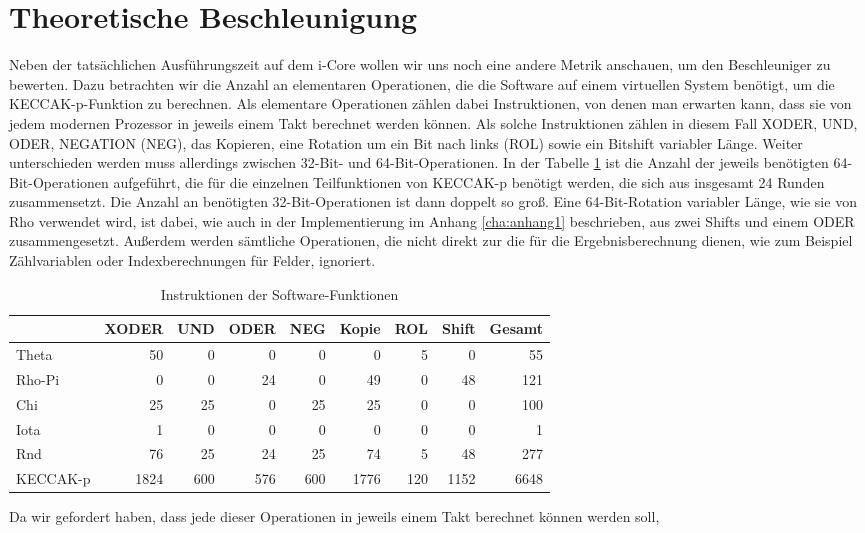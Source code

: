 \section{Theoretische Beschleunigung}
Neben der tatsächlichen Ausführungszeit auf dem i-Core wollen wir uns noch eine andere Metrik anschauen, um den Beschleuniger zu bewerten.
Dazu betrachten wir die Anzahl an elementaren Operationen, die die Software auf einem virtuellen System benötigt, um die KECCAK-p-Funktion zu berechnen.
Als elementare Operationen zählen dabei Instruktionen, von denen man erwarten kann, dass sie von jedem modernen Prozessor in jeweils einem Takt berechnet werden können.
Als solche Instruktionen zählen in diesem Fall XODER, UND, ODER, NEGATION (NEG), das Kopieren, eine Rotation um ein Bit nach links (ROL) sowie ein Bitshift variabler Länge.
Weiter unterschieden werden muss allerdings zwischen 32-Bit- und 64-Bit-Operationen. In der Tabelle \ref{tab:software_instruktionen} ist
die Anzahl der jeweils benötigten 64-Bit-Operationen aufgeführt, die für die einzelnen Teilfunktionen von KECCAK-p benötigt werden, die sich aus insgesamt 24 Runden zusammensetzt.
Die Anzahl an benötigten 32-Bit-Operationen ist dann doppelt so groß. Eine 64-Bit-Rotation variabler Länge, wie sie von Rho verwendet wird,
ist dabei, wie auch in der Implementierung im Anhang \ref{cha:anhang1} beschrieben, aus zwei Shifts und einem ODER zusammengesetzt.
Außerdem werden sämtliche Operationen, die nicht direkt zur die für die Ergebnisberechnung dienen,
wie zum Beispiel Zählvariablen oder Indexberechnungen für Felder, ignoriert.
\begin{table}
    \centering
    \begin{tabular}{lrrrrrrrr}
        & XODER & UND & ODER & NEG & Kopie & ROL & Shift & Gesamt \\
        \hline
        Theta & 50 & 0 & 0 & 0 & 0 & 5 & 0 & 55 \\
        Rho-Pi & 0 & 0 & 24 & 0 & 49 & 0 & 48 & 121 \\
        Chi & 25 & 25 & 0 & 25 & 25 & 0 & 0 & 100 \\
        Iota & 1 & 0 & 0 & 0 & 0 & 0 & 0 & 1 \\
        Rnd & 76 & 25 & 24 & 25 & 74 & 5 & 48 & 277\\
        KECCAK-p & 1824 & 600 & 576 & 600 & 1776 & 120 & 1152 & 6648
    \end{tabular}
    \label{tab:software_instruktionen}
    \caption{Instruktionen der Software-Funktionen}
\end{table}
Da wir gefordert haben, dass jede dieser Operationen in jeweils einem Takt berechnet können werden soll,
